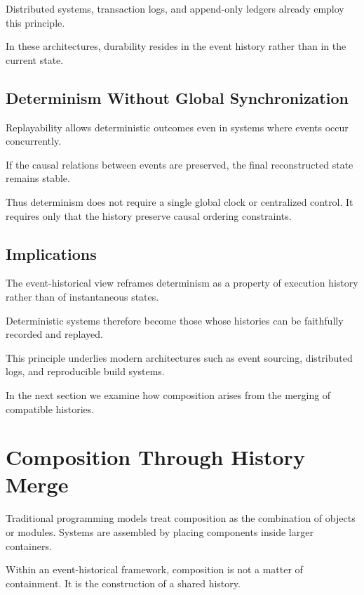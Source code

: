 \documentclass[12pt]{article}
\begin{document}
Distributed systems, transaction logs,
and append-only ledgers already employ this principle.

In these architectures, durability resides
in the event history rather than in the current state.

\subsection{Determinism Without Global Synchronization}

Replayability allows deterministic outcomes
even in systems where events occur concurrently.

If the causal relations between events are preserved,
the final reconstructed state remains stable.

Thus determinism does not require a single global clock
or centralized control. It requires only that the
history preserve causal ordering constraints.

\subsection{Implications}

The event-historical view reframes determinism
as a property of execution history rather than
of instantaneous states.

Deterministic systems therefore become those whose
histories can be faithfully recorded and replayed.

This principle underlies modern architectures such as
event sourcing, distributed logs, and reproducible
build systems.

In the next section we examine how composition
arises from the merging of compatible histories.


\section{Composition Through History Merge}

Traditional programming models treat composition as the
combination of objects or modules. Systems are assembled
by placing components inside larger containers.

Within an event-historical framework, composition is not
a matter of containment. It is the construction of a
shared history.
\end{document}

